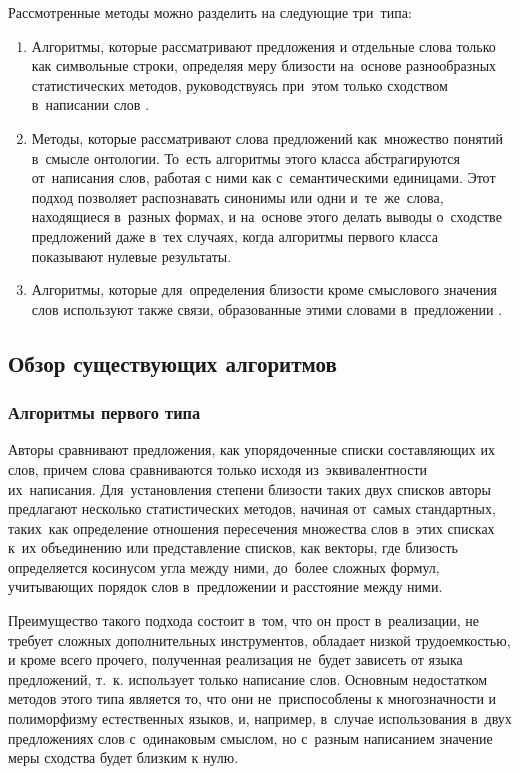 Рассмотренные методы можно разделить на следующие три~типа:

\begin{enumerate}

\item{
Алгоритмы, которые рассматривают предложения и отдельные слова только как символьные строки, 
определяя меру близости на~основе разнообразных статистических методов, 
руководствуясь при~этом только сходством в~написании слов \cite{statisticalSim}.
}

\item {
Методы, которые рассматривают слова предложений как~множество понятий в~смысле онтологии.
То~есть алгоритмы этого класса абстрагируются от~написания слов, работая с ними
как с~семантическими единицами\cite{wordnetSim}. 
Этот подход позволяет распознавать синонимы или одни и~те~же~слова, находящиеся в~разных формах,
и на~основе этого делать выводы о~сходстве предложений даже в~тех случаях,
когда алгоритмы первого класса показывают нулевые результаты.
}

\item {
Алгоритмы, которые  для~определения близости  кроме смыслового значения слов
используют также связи, образованные этими словами в~предложении \cite{weightedDep, complexSim}.}

\end{enumerate}

\subsection{Обзор существующих алгоритмов}
\subsubsection{Алгоритмы первого типа}

Авторы \cite{statisticalSim} сравнивают предложения, 
как упорядоченные списки составляющих их слов, 
причем слова сравниваются только исходя из~эквивалентности их~написания. 
Для~установления степени близости таких двух списков авторы предлагают несколько статистических методов,
начиная от~самых стандартных, таких~как определение отношения пересечения множества слов в~этих списках к~их объединению
или представление списков, как векторы, где близость определяется косинусом угла между ними,
до~более сложных формул, учитывающих порядок слов в~предложении и расстояние между ними.

Преимущество такого подхода состоит в~том, что он прост в~реализации, не требует
сложных дополнительных инструментов, обладает низкой трудоемкостью, и кроме всего прочего,
 полученная реализация не~будет зависеть от языка предложений, 
т.~к. использует только написание слов.
Основным недостатком методов этого типа является то, что они  не~приспособлены к многозначности и полиморфизму естественных языков, 
и, например, в~случае  использования в~двух предложениях слов с~одинаковым смыслом, но с~разным написанием 
значение меры сходства будет близким к нулю.

